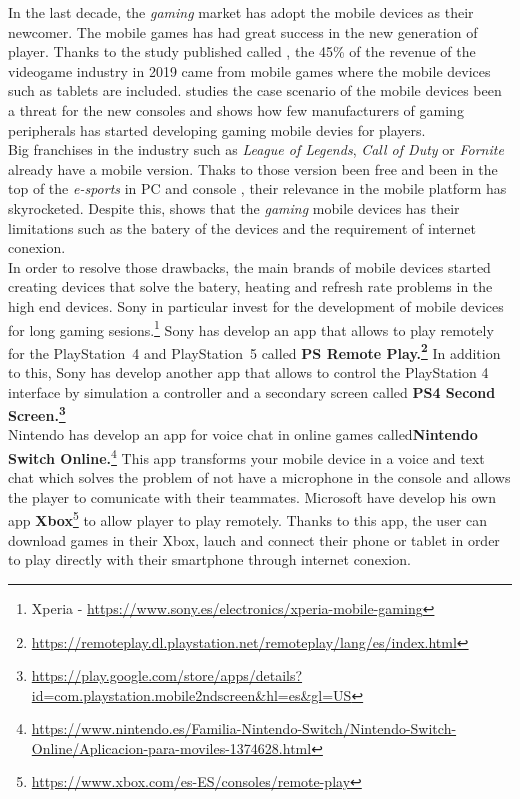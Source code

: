 In the last decade, the \textit{gaming} market has adopt the mobile devices as their newcomer. The mobile games has had great success in the new generation of player. Thanks to the study published called  \cite{AEVI2019}, the 45\% of the revenue of the videogame industry in 2019 came from mobile games where the mobile devices such as tablets are included. \cite{moviles} studies the case scenario of the mobile devices been a threat for the new consoles and shows how few manufacturers of gaming peripherals has started developing gaming mobile devies for players.\\

Big franchises in the industry such as \textit{League of Legends}, \textit{Call of Duty} or\textit{ Fornite} already have a mobile version. Thaks to those version been free and been in the top of the \textit{e-sports} in PC and console  \citep*{TEOQ32020}, their relevance in the mobile platform has skyrocketed. Despite this, \cite{futuro} shows that the \textit{gaming} mobile devices has their limitations such as the batery of the devices and the requirement of internet conexion.\\

In order to resolve those drawbacks, the main brands of mobile devices started creating devices that solve the batery, heating and refresh rate problems in the high end devices. Sony in particular invest for the development of mobile devices for long gaming sesions.\footnote{Xperia -  \url{https://www.sony.es/electronics/xperia-mobile-gaming}} Sony has develop an app that allows to play remotely for the PlayStation~4 and PlayStation~5 called \textbf{PS Remote Play.\footnote{\url{https://remoteplay.dl.playstation.net/remoteplay/lang/es/index.html}}} In addition to this, Sony has develop another app that allows to control the PlayStation 4 interface by simulation a controller and a secondary screen called \textbf{PS4 Second Screen.\footnote{\url{https://play.google.com/store/apps/details?id=com.playstation.mobile2ndscreen&hl=es&gl=US}}}\\

Nintendo has develop an app for voice chat in online games called\textbf{Nintendo Switch Online.}\footnote{\url{https://www.nintendo.es/Familia-Nintendo-Switch/Nintendo-Switch-Online/Aplicacion-para-moviles-1374628.html}} This app transforms your mobile device in a voice and text chat which solves the problem of not have a microphone in the console and allows the player to comunicate with their teammates. Microsoft have develop his own app \textbf{Xbox}\footnote{\url{https://www.xbox.com/es-ES/consoles/remote-play}} to allow player to play remotely. Thanks to this app, the user can download games in their Xbox, lauch and connect their phone or tablet in order to play directly with their smartphone through internet conexion.\\

